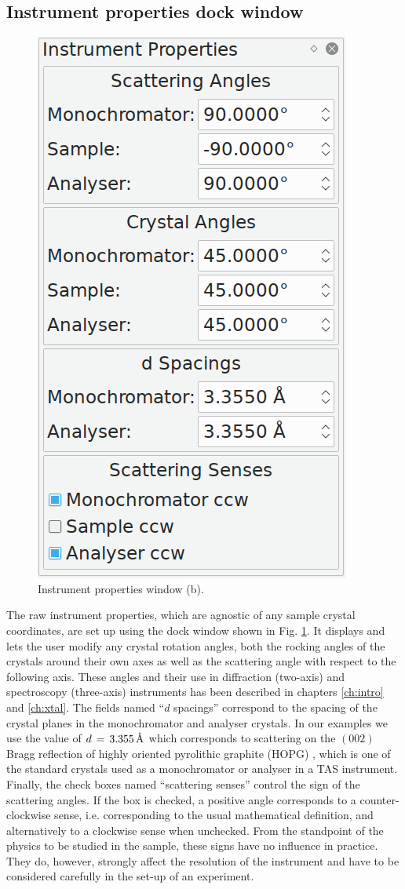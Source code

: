 \subsection{Instrument properties dock window}
\begin{minipage}{1 \textwidth}
\setlength{\intextsep}{0.25cm}
\begin{figure}
	\vspace{-0.25cm}
	\includegraphics[width = 0.25 \textwidth]{figures/gui_instrument}
	\caption[Instrument properties window.]{Instrument properties window (b).
		\label{fig:gui_instr}}
\end{figure}

The raw instrument properties, which are agnostic of any sample crystal coordinates, are set up
using the dock window shown in Fig. \ref{fig:gui_instr}. It displays and lets the user modify
any crystal rotation angles, both the rocking angles of the crystals around their own axes
as well as the scattering angle with respect to the following axis. These angles and their
use in diffraction (two-axis) and spectroscopy (three-axis) instruments has been described 
in chapters \ref{ch:intro} and \ref{ch:xtal}. 
The fields named ``$d$ spacings'' correspond to the spacing of the crystal planes in the 
monochromator and analyser crystals. In our examples we use the value of $d\,=\,3.355\, \textup{\AA}$
which corresponds to scattering on the $\left(002\right)$ Bragg reflection of highly oriented
pyrolithic graphite (HOPG) \cite[p. 250]{Shirane2002}, which is one of the standard crystals used as a
monochromator or analyser in a TAS instrument.
Finally, the check boxes named ``scattering senses'' control the sign of the scattering angles.
If the box is checked, a positive angle corresponds to a counter-clockwise sense, i.e. corresponding
to the usual mathematical definition, and alternatively to a clockwise sense when unchecked.
From the standpoint of the physics to be studied in the sample, these signs have no influence
in practice. They do, however, strongly affect the resolution of the instrument \cite{Eckold2014} \cite[p. 260]{Shirane2002}
and have to be considered carefully in the set-up of an experiment.
\end{minipage}



